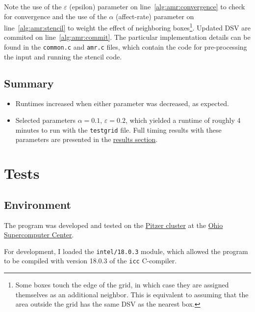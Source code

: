 \documentclass{article}
\begin{document}
Note the use of the $\varepsilon$ (epsilon) parameter on
line~\ref{alg:amr:convergence} to check for convergence and the use of the
$\alpha$ (affect-rate) parameter on line~\ref{alg:amr:stencil} to weight the
effect of neighboring boxes\footnote{Some boxes touch the edge of the grid, in
which case they are assigned themselves as an additional neighbor. This is
equivalent to assuming that the area outside the grid has the same DSV as the
nearest box.}.  Updated DSV are commited on line~\ref{alg:amr:commit}. The
particular implementation details can be found in the \texttt{common.c} and
\texttt{amr.c} files, which contain the code for pre-processing the input and
running the stencil code.

\subsection*{Summary}
\label{subsec:summary}

\begin{itemize}

    \item Runtimes increased when either parameter was decreased, as expected.

    \item Selected parameters $\alpha=0.1$, $\varepsilon=0.2$, which yielded a
    runtime of roughly 4 minutes to run with the
    \texttt{testgrid} file. Full timing
    results with these parameters are presented in the
    \hyperref[sec:results]{results section}.

\end{itemize}

\newpage
\section*{Tests}
\label{sec:tests}

\subsection*{Environment}
\label{subsec:environment}

The program was developed and tested on the
\href{https://www.osc.edu/resources/technical_support/supercomputers/pitzer}{Pitzer
cluster} at the \href{https://www.osc.edu/}{Ohio Supercomputer Center}.

For development, I loaded the \texttt{intel/18.0.3} module, which allowed the
program to be compiled with version 18.0.3 of the \texttt{icc} C-compiler.
\end{document}
